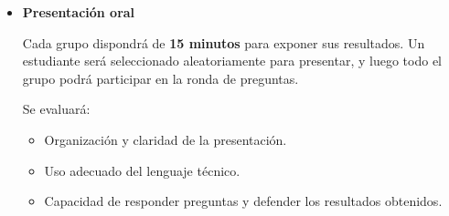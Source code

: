 \documentclass[11pt,a4paper]{article}
\begin{document}
\begin{itemize}
\begin{itemize}
        \item \textbf{Verificación de los supuestos del Modelo de Regresión Lineal Múltiple (MCRL)}:
        \begin{itemize}
            \item \textbf{Exogeneidad de los regresores}: El término de error debe cumplir:
            \[
            E(u_i | X_{i1}, X_{i2}, \dots, X_{ik}) = 0.
            \]
            Esto garantiza que los regresores no están correlacionados con el error.

            \item \textbf{Homoscedasticidad} (Breusch-Pagan, White)
            
            \item \textbf{Normalidad de los errores}

            \item \textbf{Multicolinealidad} (Factor de Inflación de la Varianza - VIF)
           
        \end{itemize}

        Si se detectan problemas en los supuestos, se deben proponer y aplicar correcciones.

        \item \textbf{Conclusiones y recomendaciones}:
        \begin{itemize}
            \item Resumen de los principales hallazgos del análisis.
            \item Evaluación de si las hipótesis fueron confirmadas o rechazadas.
            \item Limitaciones del modelo y propuestas de mejoras.
        \end{itemize}
    \end{itemize}

    \item \textbf{Presentación oral}

    Cada grupo dispondrá de \textbf{15 minutos} para exponer sus resultados. Un estudiante será seleccionado aleatoriamente para presentar, y luego todo el grupo podrá participar en la ronda de preguntas.

    Se evaluará:
    \begin{itemize}
        \item Organización y claridad de la presentación.
        \item Uso adecuado del lenguaje técnico.
        \item Capacidad de responder preguntas y defender los resultados obtenidos.
    \end{itemize}
\end{itemize}
\end{document}
